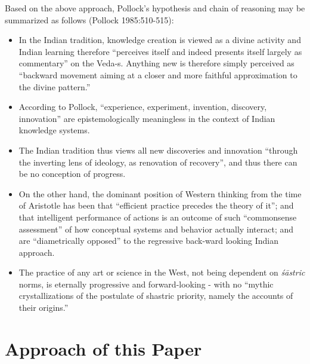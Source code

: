 Based on the above approach, Pollock's hypothesis and chain of reasoning may be summarized as follows (Pollock 1985:510-515): 
\begin{itemize}
\item In the Indian tradition, knowledge creation is viewed as a divine activity and Indian learning therefore ``perceives itself and indeed presents itself largely as commentary'' on the Veda-s. Anything new is therefore simply perceived as ``backward movement aiming at a closer and more faithful approximation to the divine pattern.''

\item According to Pollock, ``experience, experiment, invention, discovery, innovation'' are epistemologically meaningless in the context of Indian knowledge systems.

\item The Indian tradition thus views all new discoveries and innovation ``through the inverting lens of ideology, as renovation of recovery'', and thus there can be no conception of progress.

\item On the other hand, the dominant position of Western thinking from the time of Aristotle has been that ``efficient practice precedes the theory of it''; and that intelligent performance of actions is an outcome of such ``commonsense assessment'' of how conceptual systems and behavior actually interact; and are ``diametrically opposed'' to the regressive back-ward looking Indian approach. 

\item The practice of any art or science in the West, not being dependent on {\sl śāstric} norms, is eternally progressive and forward-looking - with no ``mythic crystallizations of the postulate of shastric priority, namely the accounts of their origins.''
\end{itemize}

\section*{Approach of this Paper}

